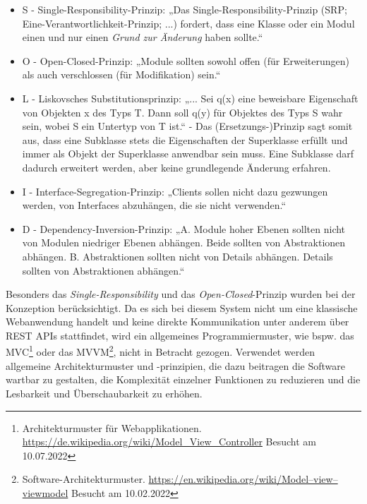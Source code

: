     \begin{itemize}
        \item S - Single-Responsibility-Prinzip: „Das Single-Responsibility-Prinzip (SRP; Eine-Verantwortlichkeit-Prinzip; ...) fordert, dass eine Klasse oder ein Modul einen und nur einen \textit{Grund zur Änderung} haben sollte.“ \cite{cleancode2009}
        \item O - Open-Closed-Prinzip: „Module sollten sowohl offen (für Erweiterungen) als auch verschlossen (für Modifikation) sein.“ \cite{ocpmeyer1988}
        \item L - Liskovsches Substitutionsprinzip: „... Sei q(x) eine beweisbare Eigenschaft von Objekten x des Typs T. Dann soll q(y) für Objektes des Typs S wahr sein, wobei S ein Untertyp von T ist.“ \cite{liskov2001behavioral} - Das (Ersetzungs-)Prinzip sagt somit aus, dass eine 
        Subklasse stets die Eigenschaften der Superklasse erfüllt und immer als Objekt der Superklasse anwendbar sein muss. Eine Subklasse darf dadurch erweitert werden, aber 
        keine grundlegende Änderung erfahren. 
        \item I - Interface-Segregation-Prinzip: „Clients sollen nicht dazu gezwungen werden, von Interfaces abzuhängen, die sie nicht verwenden.“ \cite{martin1996interface}
        \item D - Dependency-Inversion-Prinzip: „A. Module hoher Ebenen sollten nicht von Modulen niedriger Ebenen abhängen. Beide sollten von Abstraktionen abhängen. B. Abstraktionen sollten nicht von Details abhängen. Details sollten von Abstraktionen abhängen.“ \cite{martin2003agile}
    \end{itemize}
    Besonders das \textit{Single-Responsibility} und das \textit{Open-Closed}-Prinzip wurden bei der Konzeption berücksichtigt. 
    Da es sich bei diesem System nicht um eine klassische 
    Webanwendung handelt und keine direkte Kommunikation unter anderem über \acs{REST} \acs{API}s stattfindet, wird ein allgemeines 
    Programmiermuster, wie bspw. das \ac{MVC}\footnote{Architekturmuster für Webapplikationen. \url{https://de.wikipedia.org/wiki/Model_View_Controller} Besucht am 10.07.2022} 
    oder das \ac{MVVM}\footnote{Software-Architekturmuster. \url{https://en.wikipedia.org/wiki/Model–view–viewmodel} Besucht am 10.02.2022 }, nicht 
    in Betracht gezogen. Verwendet werden allgemeine Architekturmuster und -prinzipien, die dazu beitragen die Software wartbar 
    zu gestalten, die Komplexität einzelner Funktionen zu reduzieren und die Lesbarkeit und Überschaubarkeit zu erhöhen. 
    
